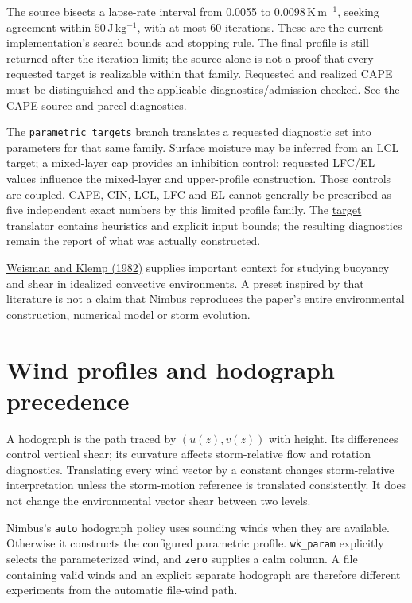 The source bisects a lapse-rate interval from 0.0055 to
$0.0098\,\mathrm{K\,m^{-1}}$, seeking agreement within
$50\,\mathrm{J\,kg^{-1}}$, with at most 60 iterations. These are the current
implementation's search bounds and stopping rule. The final profile is still
returned after the iteration limit; the source alone is not a proof that every
requested target is realizable within that family. Requested and realized
CAPE must be distinguished and the applicable diagnostics/admission checked.
See \href{../src/init/sounding/sources/parametric_cape.cpp}{the CAPE source}
and \href{../src/init/sounding/diagnostics.cpp}{parcel diagnostics}.

The \texttt{parametric\_targets} branch translates a requested diagnostic set
into parameters for that same family. Surface moisture may be inferred from an
LCL target; a mixed-layer cap provides an inhibition control; requested LFC/EL
values influence the mixed-layer and upper-profile construction. Those controls
are coupled. CAPE, CIN, LCL, LFC and EL cannot generally be prescribed as five
independent exact numbers by this limited profile family. The
\href{../src/init/sounding/sources/parametric_targets.cpp}{target translator}
contains heuristics and explicit input bounds; the resulting diagnostics remain
the report of what was actually constructed.

\href{https://journals.ametsoc.org/abstract/journals/mwre/110/6/1520-0493_1982_110_0504_tdonsc_2_0_co_2.xml}{Weisman
and Klemp (1982)} supplies important context for studying buoyancy and shear in
idealized convective environments. A preset inspired by that literature is not
a claim that Nimbus reproduces the paper's entire environmental construction,
numerical model or storm evolution.

\section{Wind profiles and hodograph precedence}

A hodograph is the path traced by $(u(z),v(z))$ with height. Its differences
control vertical shear; its curvature affects storm-relative flow and rotation
diagnostics. Translating every wind vector by a constant changes storm-relative
interpretation unless the storm-motion reference is translated consistently.
It does not change the environmental vector shear between two levels.

Nimbus's \texttt{auto} hodograph policy uses sounding winds when they are
available. Otherwise it constructs the configured parametric profile.
\texttt{wk\_param} explicitly selects the parameterized wind, and
\texttt{zero} supplies a calm column. A file containing valid winds and an
explicit separate hodograph are therefore different experiments from the
automatic file-wind path.

